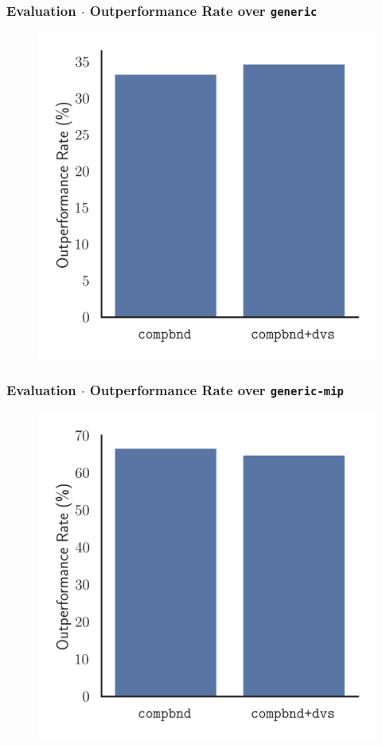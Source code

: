 \documentclass[compress,beamer,aspectratio=169,english,usenames,dvipsnames]{beamer}
\begin{document}
\begin{frame}
\frametitle{Evaluation $\cdot$ Outperformance Rate over \texttt{generic}}
\centering
\begin{figure}
\includegraphics[height=0.85\textheight]{graphics/slides/general/MostFractional/outperforms_generic.png}
\end{figure}
\end{frame}

\begin{frame}
\frametitle{Evaluation $\cdot$ Outperformance Rate over \texttt{generic-mip}}
\centering
\begin{figure}
\includegraphics[height=0.85\textheight]{graphics/slides/general/MostFractional/outperforms_generic-mip.png}
\end{figure}
\end{frame}
\end{document}
